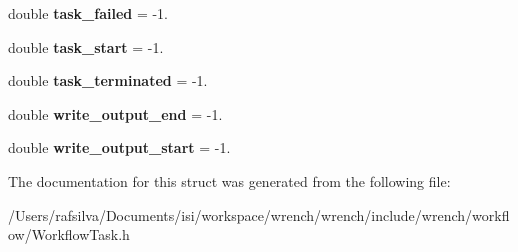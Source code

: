\begin{DoxyCompactItemize}
double {\bfseries task\+\_\+failed} = -\/1.
\item 
\mbox{\label{structwrench_1_1_workflow_task_1_1_workflow_task_execution_a2d755ca6a024a96318067f41efe711c8}} 
double {\bfseries task\+\_\+start} = -\/1.
\item 
\mbox{\label{structwrench_1_1_workflow_task_1_1_workflow_task_execution_a0a41cb1f38b6c6fa3a27fb848d4555e2}} 
double {\bfseries task\+\_\+terminated} = -\/1.
\item 
\mbox{\label{structwrench_1_1_workflow_task_1_1_workflow_task_execution_a92b2b57919e6f8ecd2f991f9a98c7b56}} 
double {\bfseries write\+\_\+output\+\_\+end} = -\/1.
\item 
\mbox{\label{structwrench_1_1_workflow_task_1_1_workflow_task_execution_ad0f0c1f1b720d2b8413228a8320c3837}} 
double {\bfseries write\+\_\+output\+\_\+start} = -\/1.
\end{DoxyCompactItemize}


The documentation for this struct was generated from the following file\+:\begin{DoxyCompactItemize}
\item 
/\+Users/rafsilva/\+Documents/isi/workspace/wrench/wrench/include/wrench/workflow/Workflow\+Task.\+h\end{DoxyCompactItemize}
